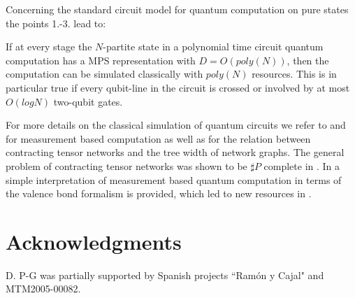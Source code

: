 \documentclass[aps,prl,epsfig,graphics,floatfix,mathbbm,a4paper]{article}
\newcommand{\1}{\mathbbm{1}}
\renewcommand{\>}{\rangle}
\newcommand{\<}{\langle}
\begin{document}
Concerning the standard circuit model for quantum computation on
pure states the points 1.-3. lead to:
\begin{theorem}\label{Thm:CircuitComputation}
    If at every stage the $N$-partite state in a polynomial time
    circuit quantum computation has a MPS representation with
    $D=O(poly(N))$, then the computation can be simulated classically
    with $poly(N)$ resources. This is in particular true if every
    qubit-line in the circuit is crossed or involved by at most $O(log
        N)$ two-qubit gates.
\end{theorem}
For more details on the classical simulation of quantum circuits
we refer to \cite{Jozsa} and \cite{YoranShort} for measurement
based computation as well as for the relation between contracting
tensor networks and the tree width of network graphs. The general
problem of contracting tensor networks was shown to be $\sharp P$
complete in \cite{PEPScomplexity}.
In
\cite{FCcluster} a simple interpretation of measurement based
quantum computation in terms of the valence bond formalism is
provided, which led to new resources in \cite{newresources}.



\section*{Acknowledgments}

D. P-G was partially supported by Spanish projects ``Ram\'on y
Cajal" and MTM2005-00082.
\end{document}
